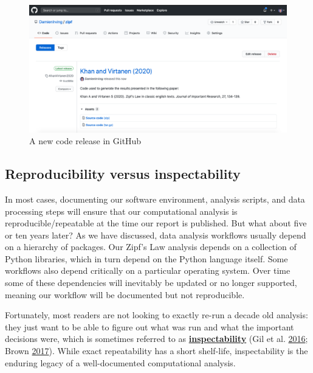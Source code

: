 \documentclass[
]{krantz}
\newcommand{\gref}[2]{\hyperlink{#2}{\textbf{#1}}}
\begin{document}
\begin{figure}

{\centering \includegraphics[width=1\linewidth]{figures/provenance/release} 

}

\caption{A new code release in GitHub}\label{fig:provenance-release}
\end{figure}

\hypertarget{provenance-inspectability}{%
\subsection{Reproducibility versus inspectability}\label{provenance-inspectability}}

In most cases,
documenting our software environment, analysis scripts, and data processing steps
will ensure that our computational analysis is reproducible/repeatable
at the time our report is published.
But what about five or ten years later?
As we have discussed,
data analysis workflows usually depend on a hierarchy of packages.
Our Zipf's Law analysis depends on a collection of Python libraries,
which in turn depend on the Python language itself.
Some workflows also depend critically on a particular operating system.
Over time some of these dependencies will inevitably be updated or no longer supported,
meaning our workflow will be documented but not reproducible.

Fortunately,
most readers are not looking to exactly re-run a decade old analysis:
they just want to be able to figure out what was run
and what the important decisions were,
which is sometimes referred to as \gref{inspectability}{inspectability}
(Gil et al. \protect\hyperlink{ref-Gil2016}{2016}; Brown \protect\hyperlink{ref-Brown2017}{2017}).
While exact repeatability has a short shelf-life,
inspectability is the enduring legacy of a well-documented computational analysis.
\end{document}
